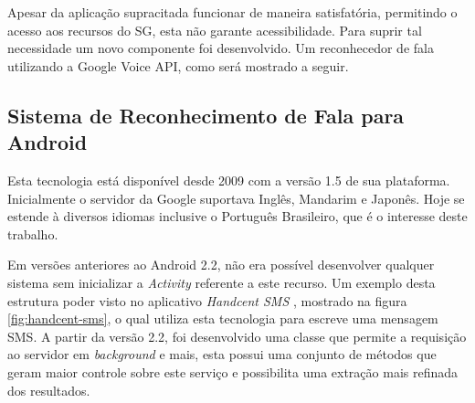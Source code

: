 \documentclass[12pt,a4paper,oneside]{report}
\begin{document}
Apesar da aplicação supracitada funcionar de maneira satisfatória, permitindo o acesso aos recursos do SG, esta não garante acessibilidade. Para suprir tal necessidade um novo componente foi desenvolvido. Um reconhecedor de fala utilizando a Google Voice API, como será mostrado a seguir.

\subsection{Sistema de Reconhecimento de Fala para Android}

Esta tecnologia está disponível desde 2009 com a versão 1.5 de sua plataforma. Inicialmente o servidor da Google suportava Inglês, Mandarim e Japonês. Hoje se estende à diversos idiomas inclusive o Português Brasileiro, que é o interesse deste trabalho.

Em versões anteriores ao Android 2.2, não era possível desenvolver qualquer sistema sem inicializar a \emph{Activity} referente a este recurso. Um exemplo desta estrutura poder visto no aplicativo \emph{Handcent SMS} \cite{handcent}, mostrado na figura \ref{fig:handcent-sms}, o qual utiliza esta tecnologia para escreve uma mensagem SMS. A partir da versão 2.2, foi desenvolvido uma classe que permite a requisição ao servidor em \emph{background} e mais, esta possui uma conjunto de métodos que geram maior controle sobre este serviço e possibilita uma extração mais refinada dos resultados.
\end{document}
